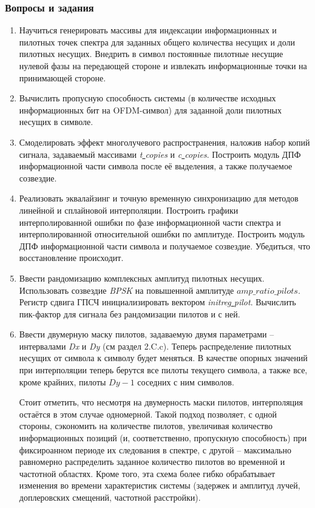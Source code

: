 \subsubsection{Вопросы и задания}
\begin{enumerate}
\item
Научиться генерировать массивы для индексации информационных и пилотных точек спектра для заданных общего количества несущих и доли пилотных несущих. Внедрить в символ постоянные пилотные несущие нулевой фазы на передающей стороне и извлекать информационные точки на принимающей стороне.
\item
Вычислить пропусную способность системы (в количестве исходных информационных бит на OFDM-символ) для заданной доли пилотных несущих в символе.
\item
Смоделировать эффект многолучевого распространения, наложив набор копий сигнала, задаваемый массивами \textit{t\underline{ }copies} и \textit{c\underline{ }copies}. Построить модуль ДПФ  информационной части символа после её выделения, а также получаемое созвездие.
\item
Реализовать эквалайзинг и точную временную синхронизацию для методов линейной и сплайновой интерполяции. Построить графики интерполированной ошибки по фазе информационной части спектра и интерполированной относительной ошибки по амплитуде. Построить модуль ДПФ информационной части символа и получаемое созвездие. Убедиться, что восстановление происходит.
\item 
Ввести рандомизацию комплексных амплитуд пилотных несущих. Использовать созвездие \textit{BPSK} на повышенной амплитуде $amp\_ratio\_pilots$. Регистр сдвига ГПСЧ инициализировать вектором \textit{initreg\underline{ }pilot}. Вычислить пик-фактор для сигнала без рандомизации пилотов и с ней.
\item %
Ввести двумерную маску пилотов, задаваемую двумя параметрами -- интервалами  \textit{Dx} и \textit{Dy} (см раздел 2.C.c). Теперь распределение пилотных несущих от символа к символу будет меняться. В качестве опорных значений при интерполяции теперь берутся все пилоты текущего символа, а также все, кроме крайних, пилоты $Dy-1$ соседних с ним символов.

Стоит отметить, что несмотря на двумерность маски пилотов, интерполяция остаётся в этом случае одномерной. Такой подход позволяет, с одной стороны, сэкономить на количестве пилотов, увеличивая количество информационных позиций (и, соответственно, пропускную способность) при фиксироанном периоде их следования в спектре, с другой -- максимально равномерно распределить заданное количество пилотов во временной и частотной областях. Кроме того, эта схема более гибко обрабатывает изменения во времени характеристик системы (задержек и амплитуд лучей, доплеровских смещений, частотной расстройки).
\end{enumerate}